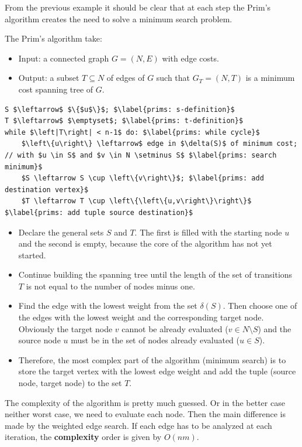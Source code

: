 \noindent
From the previous example it should be clear that at each step the Prim's algorithm creates the need to solve a minimum search problem.

\highspace
The Prim's algorithm take:
\begin{itemize}
    \item Input: a connected graph $G = \left(N,E\right)$ with edge costs.
    \item Output: a subset $T \subseteq N$ of edges of $G$ such that $G_{T} = \left(N,T\right)$ is a minimum cost spanning tree of $G$.
\end{itemize}

\begin{lstlisting}[language=pseudo-code, caption={Minimum spanning tree (MST) problem: Prim's $O\left(nm\right)$}]
S $\leftarrow$ $\{$u$\}$; $\label{prims: s-definition}$
T $\leftarrow$ $\emptyset$; $\label{prims: t-definition}$
while $\left|T\right| < n-1$ do: $\label{prims: while cycle}$
    $\left\{u\right\} \leftarrow$ edge in $\delta(S)$ of minimum cost; // with $u \in S$ and $v \in N \setminus S$ $\label{prims: search minimum}$
    $S \leftarrow S \cup \left\{v\right\}$; $\label{prims: add destination vertex}$
    $T \leftarrow T \cup \left\{\left\{u,v\right\}\right\}$ $\label{prims: add tuple source destination}$
\end{lstlisting}
\begin{itemize}
    \item[Rows \ref{prims: s-definition}-\ref{prims: t-definition}.] Declare the general sets $S$ and $T$. The first is filled with the starting node $u$ and the second is empty, because the core of the algorithm has not yet started.

    \item[Row \ref{prims: while cycle}.] Continue building the spanning tree until the length of the set of transitions $T$ is not equal to the number of nodes minus one.

    \item[Row \ref{prims: search minimum}.] Find the edge with the lowest weight from the set $\delta\left(S\right)$. Then choose one of the edges with the lowest weight and the corresponding target node. Obviously the target node $v$ cannot be already evaluated ($v \in N \setminus S$) and the source node $u$ must be in the set of nodes already evaluated ($u \in S$).
    
    \item[Rows \ref{prims: add destination vertex}-\ref{prims: add tuple source destination}.] Therefore, the most complex part of the algorithm (minimum search) is to store the target vertex with the lowest edge weight and add the tuple (source node, target node) to the set $T$.
\end{itemize}
The complexity of the algorithm is pretty much guessed. Or in the better case neither worst case, we need to evaluate each node. Then the main difference is made by the weighted edge search. If each edge has to be analyzed at each iteration, the \textbf{complexity} order is given by $O\left(nm\right)$.